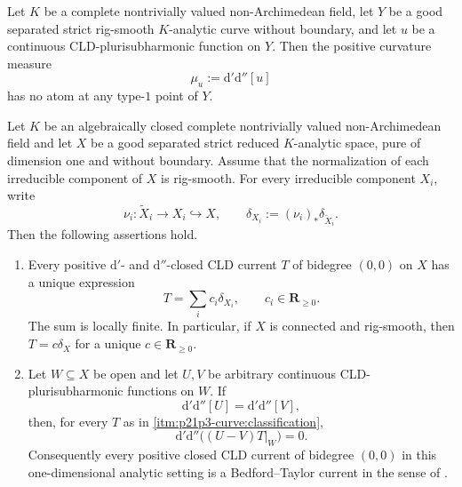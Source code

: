 
\begin{lemma}
\label{lem:p21p3-type-one-zero-atom}
Let $K$ be a complete nontrivially valued non-Archimedean field, let
$Y$ be a good separated strict rig-smooth $K$-analytic curve without
boundary, and let $u$ be a continuous CLD-plurisubharmonic function on
$Y$. Then the positive curvature measure
\[
                 \mu_u:=\mathrm d'\mathrm d''[u]
\]
has no atom at any type-$1$ point of $Y$.
\end{lemma}

\begin{proposition}
\label{prop:p21p3-curve-rigidity}
Let $K$ be an algebraically closed complete nontrivially valued
non-Archimedean field and let $X$ be a good separated strict reduced
$K$-analytic space, pure of dimension one and without boundary. Assume
that the normalization of each irreducible component of $X$ is
rig-smooth. For every irreducible component $X_i$, write
\[
        \nu_i:\widetilde X_i\longrightarrow X_i\hookrightarrow X,
        \qquad
        \delta_{X_i}:=(\nu_i)_*\delta_{\widetilde X_i}.
\]
Then the following assertions hold.

\begin{enumerate}
\item\label{itm:p21p3-curve:classification}
Every positive $\mathrm d'$- and $\mathrm d''$-closed CLD current $T$
of bidegree $(0,0)$ on $X$ has a unique expression
\begin{equation}
\label{eq:p21p3-curve-classification}
                         T=\sum_i c_i\delta_{X_i},
                         \qquad c_i\in\mathbf R_{\geq 0}.
\end{equation}
The sum is locally finite. In particular, if $X$ is connected and
rig-smooth, then $T=c\delta_X$ for a unique
$c\in\mathbf R_{\geq 0}$.

\item\label{itm:p21p3-curve:bedford-taylor}
Let $W\subseteq X$ be open and let $U,V$ be arbitrary continuous
CLD-plurisubharmonic functions on $W$. If
\begin{equation}
\label{eq:p21p3-curve-equal-curvature}
           \mathrm d'\mathrm d''[U]
           =\mathrm d'\mathrm d''[V],
\end{equation}
then, for every $T$ as in
\cref{itm:p21p3-curve:classification},
\begin{equation}
\label{eq:p21p3-curve-bt-conclusion}
             \mathrm d'\mathrm d''\bigl((U-V)T|_W\bigr)=0.
\end{equation}
Consequently every positive closed CLD current of bidegree $(0,0)$ in
this one-dimensional analytic setting is a Bedford--Taylor current in the
sense of \cite[Definition~8.6.2]{CLD25}.
\end{enumerate}
\end{proposition}


